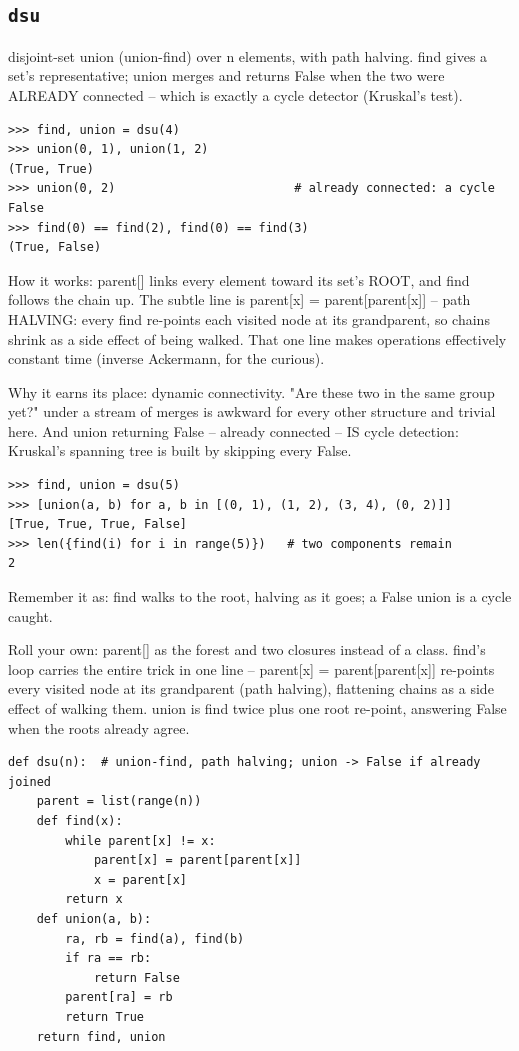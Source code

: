 \documentclass[10pt,letterpaper]{book}
\begin{document}
\subsection{\texttt{dsu}}\label{def:dsu}
disjoint-set union (union-find) over n elements, with path halving. find gives a set's representative; union merges and returns False when the two were ALREADY connected -- which is exactly a cycle detector (Kruskal's test).
\begin{lstlisting}[style=ex]
>>> find, union = dsu(4)
>>> union(0, 1), union(1, 2)
(True, True)
>>> union(0, 2)                         # already connected: a cycle
False
>>> find(0) == find(2), find(0) == find(3)
(True, False)
\end{lstlisting}

How it works: parent[] links every element toward its set's ROOT, and find follows the chain up. The subtle line is parent[x] = parent[parent[x]] -- path HALVING: every find re-points each visited node at its grandparent, so chains shrink as a side effect of being walked. That one line makes operations effectively constant time (inverse Ackermann, for the curious).


Why it earns its place: dynamic connectivity. "Are these two in the same group yet?" under a stream of merges is awkward for every other structure and trivial here. And union returning False -- already connected -- IS cycle detection: Kruskal's spanning tree is built by skipping every False.

\begin{lstlisting}[style=ex]
>>> find, union = dsu(5)
>>> [union(a, b) for a, b in [(0, 1), (1, 2), (3, 4), (0, 2)]]
[True, True, True, False]
>>> len({find(i) for i in range(5)})   # two components remain
2
\end{lstlisting}

Remember it as: find walks to the root, halving as it goes; a False union is a cycle caught.


Roll your own: parent[] as the forest and two closures instead of a class. find's loop carries the entire trick in one line -- parent[x] = parent[parent[x]] re-points every visited node at its grandparent (path halving), flattening chains as a side effect of walking them. union is find twice plus one root re-point, answering False when the roots already agree.

\begin{lstlisting}[style=ex]
def dsu(n):  # union-find, path halving; union -> False if already joined
    parent = list(range(n))
    def find(x):
        while parent[x] != x:
            parent[x] = parent[parent[x]]
            x = parent[x]
        return x
    def union(a, b):
        ra, rb = find(a), find(b)
        if ra == rb:
            return False
        parent[ra] = rb
        return True
    return find, union
\end{lstlisting}
\end{document}
